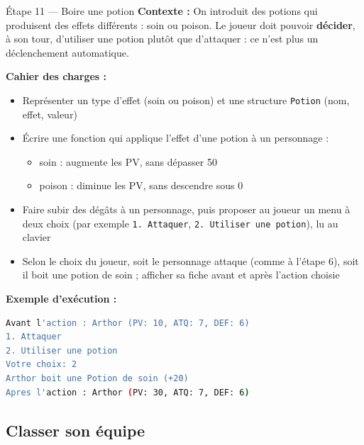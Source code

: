 \begin{UPSTIManipulation}{Étape 11 — Boire une potion}
  \textbf{Contexte :} On introduit des potions qui produisent des effets différents : soin ou
  poison. Le joueur doit pouvoir \textbf{décider}, à son tour, d'utiliser une potion plutôt que
  d'attaquer : ce n'est plus un déclenchement automatique.

  \textbf{Cahier des charges :}
  \begin{itemize}
    \item Représenter un type d'effet (soin ou poison) et une structure \texttt{Potion} (nom,
      effet, valeur)
    \item Écrire une fonction qui applique l'effet d'une potion à un personnage :
      \begin{itemize}
        \item soin : augmente les PV, sans dépasser 50
        \item poison : diminue les PV, sans descendre sous 0
      \end{itemize}
    \item Faire subir des dégâts à un personnage, puis proposer au joueur un menu à deux choix
      (par exemple \texttt{1. Attaquer}, \texttt{2. Utiliser une potion}), lu au clavier
    \item Selon le choix du joueur, soit le personnage attaque (comme à l'étape 6), soit il
      boit une potion de soin ; afficher sa fiche avant et après l'action choisie
  \end{itemize}

  \textbf{Exemple d'exécution :}
  \begin{lstlisting}[language=bash]
Avant l'action : Arthor (PV: 10, ATQ: 7, DEF: 6)
1. Attaquer
2. Utiliser une potion
Votre choix: 2
Arthor boit une Potion de soin (+20)
Apres l'action : Arthor (PV: 30, ATQ: 7, DEF: 6)
  \end{lstlisting}

\end{UPSTIManipulation}

\subsection{Classer son équipe}

